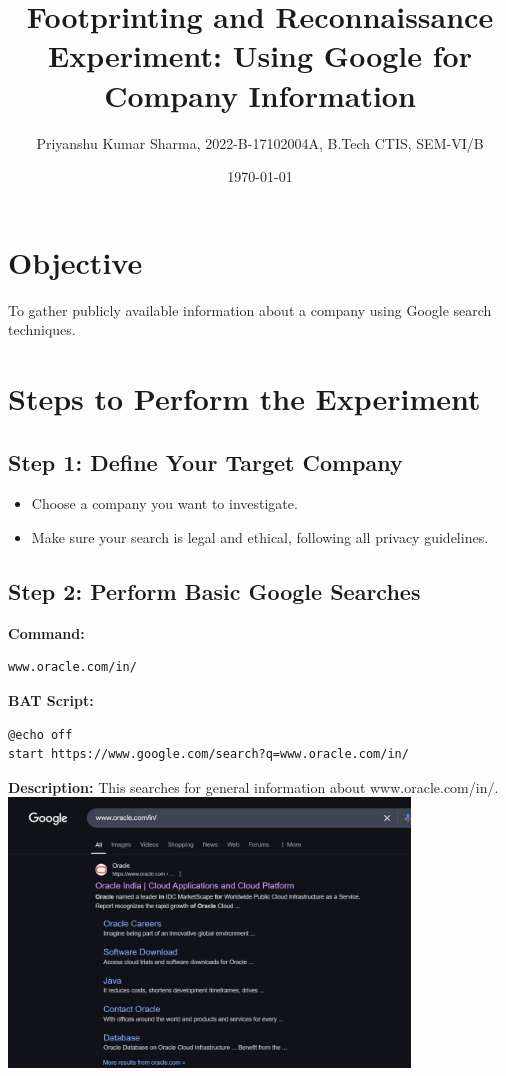 \documentclass{article}
\begin{document}
\title{Footprinting and Reconnaissance Experiment: Using Google for Company Information}
\author{Priyanshu Kumar Sharma, 2022-B-17102004A, B.Tech CTIS, SEM-VI/B}
\date{\today}
\maketitle

\section{Objective}
To gather publicly available information about a company using Google search techniques.

\section{Steps to Perform the Experiment}

\subsection{Step 1: Define Your Target Company}
\begin{itemize}
    \item Choose a company you want to investigate.
    \item Make sure your search is legal and ethical, following all privacy guidelines.
\end{itemize}

\subsection{Step 2: Perform Basic Google Searches}
\textbf{Command:}
\begin{lstlisting}
www.oracle.com/in/
\end{lstlisting}
\textbf{BAT Script:}
\begin{lstlisting}
@echo off
start https://www.google.com/search?q=www.oracle.com/in/
\end{lstlisting}
\textbf{Description:} This searches for general information about www.oracle.com/in/.
\includegraphics[width=0.8\textwidth]{images/basic_search.png}
\end{document}
